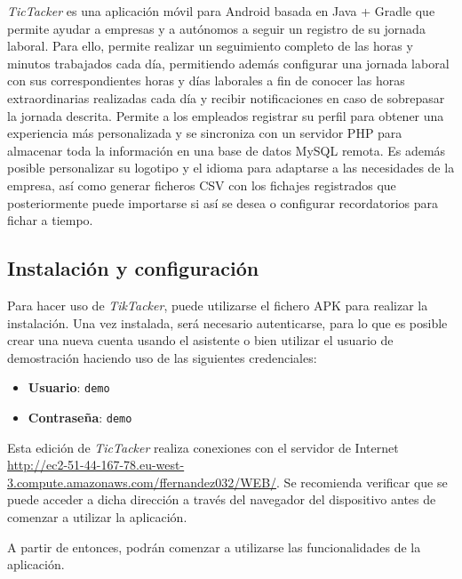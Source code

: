 \textit{TicTacker} es una aplicación móvil para Android basada en Java + Gradle que permite ayudar a empresas y a autónomos a seguir un registro de su jornada laboral. Para ello, permite realizar un seguimiento completo de las horas y minutos trabajados cada día, permitiendo además configurar una jornada laboral con sus correspondientes horas y días laborales a fin de conocer las horas extraordinarias realizadas cada día y recibir notificaciones en caso de sobrepasar la jornada descrita. Permite a los empleados registrar su perfil para obtener una experiencia más personalizada y se sincroniza con un servidor PHP para almacenar toda la información en una base de datos MySQL remota. Es además posible personalizar su logotipo y el idioma para adaptarse a las necesidades de la empresa, así como generar ficheros CSV con los fichajes registrados que posteriormente puede importarse si así se desea o configurar recordatorios para fichar a tiempo.

\subsection{Instalación y configuración}

Para hacer uso de \textit{TikTacker}, puede utilizarse el fichero APK para realizar la instalación. Una vez instalada, será necesario autenticarse, para lo que es posible crear una nueva cuenta usando el asistente o bien utilizar el usuario de demostración haciendo uso de las siguientes credenciales:

\begin{itemize}
    \item \textbf{Usuario}: \texttt{demo}
    \item \textbf{Contraseña}: \texttt{demo}
\end{itemize}

\begin{tcolorbox}
    [colback=red!5!white,colframe=red!75!black,fonttitle=\bfseries,title=Conexión a Internet]
     Esta edición de \textit{TicTacker} realiza conexiones con el servidor de Internet \url{http://ec2-51-44-167-78.eu-west-3.compute.amazonaws.com/ffernandez032/WEB/}. Se recomienda verificar que se puede acceder a dicha dirección a través del navegador del dispositivo antes de comenzar a utilizar la aplicación.
    \end{tcolorbox}

A partir de entonces, podrán comenzar a utilizarse las funcionalidades de la aplicación.